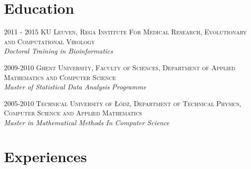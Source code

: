\documentclass[a4paper, oneside, final]{scrartcl}
\newenvironment{lyxlist}[1]
{\begin{list}{}
{\settowidth{\labelwidth}{#1}
 \setlength{\leftmargin}{\labelwidth}
 \addtolength{\leftmargin}{\labelsep}
 \renewcommand{\makelabel}[1]{##1\hfil}}}
{\end{list}}
\newcommand{\noun}[1]{\textsc{#1}}
\begin{document}


\begin{center}
\section{Education}

\begin{lyxlist}{00.00.0000}
\item [{\noun{\scriptsize 2011 - 2015}}] \noun{KU Leuven,
Rega Institute For Medical Research, Evolutionary and Computational Virology }\\
\emph{Doctoral Training in Bioinformatics}
\item [{\noun{\scriptsize 2009-2010}}] \noun{Ghent University, Faculty
of Sciences, Department of Applied Mathematics and Computer Science}\\
\emph{Master of Statistical Data Analysis Programme}
\item [{\noun{\scriptsize 2005-2010}}] \noun{Technical University of \L{}ód\'{z},
Department of Technical Physics, Computer Science and Applied Mathematics}\\
\emph{Master in Mathematical Methods In Computer Science}
\end{lyxlist}

\section{Experiences}
\vspace{-8pt}

\begin{tabularx}{1.0\linewidth}{>{\raggedleft\scshape}p{2cm}X}


\end{tabularx}
\end{center}
\end{document}
